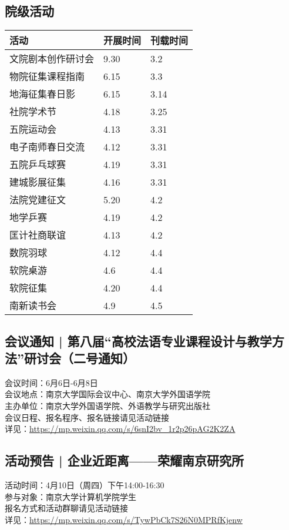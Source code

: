 \documentclass[letterpaper, 12pt]{article}
\begin{document}
\begin{multicols}{2}
\section{院级活动}
\begin{tabular}{|>{\centering\arraybackslash}m{}|m{}|m{}|}
\hline
    活动 & 开展时间 & 刊载时间\\
    \hline\hline
    文院剧本创作研讨会 & 9.30 & 3.2\\
    物院征集课程指南 & 6.15 & 3.3\\
    地海征集春日影 & 6.15 & 3.14\\
    社院学术节 & 4.18 & 3.25\\
    五院运动会 & 4.13 & 3.31\\
    电子南师春日交流 & 4.12 & 3.31\\
    五院乒乓球赛 & 4.19 & 3.31\\
    建城影展征集 & 4.16 & 3.31\\
    法院党建征文 & 5.20 & 4.2\\
    地学乒赛 & 4.19 & 4.2\\
    匡计社商联谊 & 4.13 & 4.2\\
    数院羽球 & 4.12 & 4.4\\
    软院桌游 & 4.6 & 4.4\\
    软院征集 & 4.20 & 4.4\\
    南新读书会 & 4.9 & 4.5\\
    \hline
\end{tabular}
\subsection{会议通知 | 第八届“高校法语专业课程设计与教学方法”研讨会（二号通知）}
会议时间：6月6日-6月8日
\\会议地点：南京大学国际会议中心、南京大学外国语学院
\\主办单位：南京大学外国语学院、外语教学与研究出版社
\\会议日程、报名程序、报名链接请见活动链接
\\详见：\url{https://mp.weixin.qq.com/s/6snI2bv_1r2p26pAG2K2ZA}
\subsection{活动预告 | 企业近距离——荣耀南京研究所}
活动时间：4月10日（周四）下午14:00-16:30
\\参与对象：南京大学计算机学院学生
\\报名方式和活动群聊请见活动链接
\\详见：\url{https://mp.weixin.qq.com/s/TywPbCk7S26N0MPRfKjenw}


\end{multicols}
\end{document}
